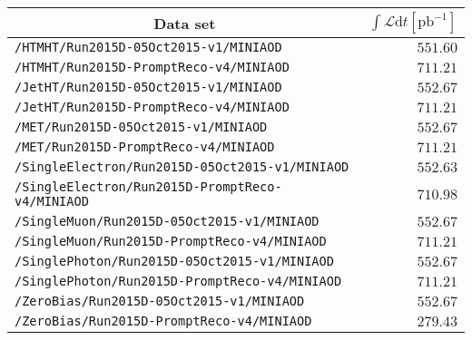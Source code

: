 \begin{center}
\begin{tabular}{lr}
\hline\hline
\multicolumn{1}{c}{Data set}&\multicolumn{1}{c}{$\int\mathcal{L}\textrm{d}t [\textrm{pb}^{-1}]$}\tabularnewline
\hline
\verb!/HTMHT/Run2015D-05Oct2015-v1/MINIAOD! &$551.60$\tabularnewline
\verb!/HTMHT/Run2015D-PromptReco-v4/MINIAOD! &$711.21$\tabularnewline
\verb!/JetHT/Run2015D-05Oct2015-v1/MINIAOD! &$552.67$\tabularnewline
\verb!/JetHT/Run2015D-PromptReco-v4/MINIAOD! &$711.21$\tabularnewline
\verb!/MET/Run2015D-05Oct2015-v1/MINIAOD! &$552.67$\tabularnewline
\verb!/MET/Run2015D-PromptReco-v4/MINIAOD! &$711.21$\tabularnewline
\verb!/SingleElectron/Run2015D-05Oct2015-v1/MINIAOD! &$552.63$\tabularnewline
\verb!/SingleElectron/Run2015D-PromptReco-v4/MINIAOD! &$710.98$\tabularnewline
\verb!/SingleMuon/Run2015D-05Oct2015-v1/MINIAOD! &$552.67$\tabularnewline
\verb!/SingleMuon/Run2015D-PromptReco-v4/MINIAOD! &$711.21$\tabularnewline
\verb!/SinglePhoton/Run2015D-05Oct2015-v1/MINIAOD! &$552.67$\tabularnewline
\verb!/SinglePhoton/Run2015D-PromptReco-v4/MINIAOD! &$711.21$\tabularnewline
\verb!/ZeroBias/Run2015D-05Oct2015-v1/MINIAOD! &$552.67$\tabularnewline
\verb!/ZeroBias/Run2015D-PromptReco-v4/MINIAOD! &$279.43$\tabularnewline
 \hline
\end{tabular}\end{center}
